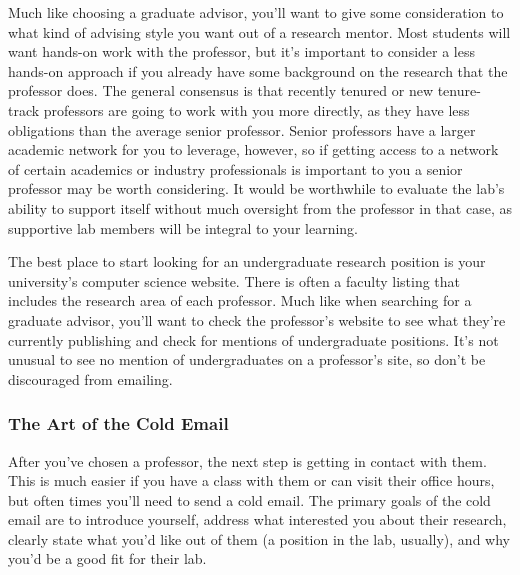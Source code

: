 \documentclass[12pt]{article}
\begin{document}
Much like choosing a graduate advisor, you'll want to give some consideration to what kind of advising style you want out of a research mentor. Most students will want hands-on work with the professor, but it's important to consider a less hands-on approach if you already have some background on the research that the professor does. The general consensus is that recently tenured or new tenure-track professors are going to work with you more directly, as they have less obligations than the average senior professor. Senior professors have a larger academic network for you to leverage, however, so if getting access to a network of certain academics or industry professionals is important to you a senior professor may be worth considering. It would be worthwhile to evaluate the lab's ability to support itself without much oversight from the professor in that case, as supportive lab members will be integral to your learning.

The best place to start looking for an undergraduate research position is your university's computer science website. There is often a faculty listing that includes the research area of each professor. Much like when searching for a graduate advisor, you'll want to check the professor's website to see what they're currently publishing and check for mentions of undergraduate positions. It's not unusual to see no mention of undergraduates on a professor's site, so don't be discouraged from emailing.

\subsubsection{The Art of the Cold Email}

After you've chosen a professor, the next step is getting in contact with them. This is much easier if you have a class with them or can visit their office hours, but often times you'll need to send a cold email. The primary goals of the cold email are to introduce yourself, address what interested you about their research, clearly state what you'd like out of them (a position in the lab, usually), and why you'd be a good fit for their lab.
\end{document}
